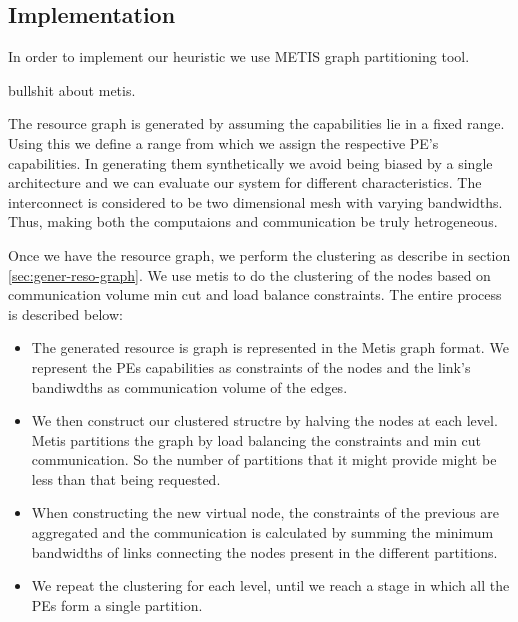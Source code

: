 \subsection{Implementation}
\label{sec:imple}

In order to implement our heuristic we use METIS \cite{} graph
partitioning tool.

bullshit about metis.

The resource graph is generated by assuming the capabilities lie in a
fixed range. Using this we define a range from which we assign the
respective PE's capabilities. In generating them synthetically we avoid
being biased by a single architecture and we can evaluate our system
for different characteristics. The interconnect is considered to be two
dimensional mesh with varying bandwidths. Thus, making both the
computaions and communication be truly hetrogeneous.

Once we have the resource graph, we perform the clustering as describe
in section \ref{sec:gener-reso-graph}. We use metis to do the
clustering of the nodes based on communication volume min cut and load
balance constraints. The entire process is described below:

\begin{itemize}

\item The generated resource is graph is represented in the Metis
graph format. We represent the PEs capabilities as constraints of the
nodes and the link's bandiwdths as communication volume of the edges.

\item We then construct our clustered structre by halving the nodes at
each level. Metis partitions the graph by load balancing the
constraints and min cut communication. So the number of partitions
that it might provide might be less than that being requested.

\item When constructing the new virtual node, the constraints of the
previous are aggregated and the communication is calculated by summing
the minimum bandwidths of links connecting the nodes present in the
different partitions.

\item We repeat the clustering for each level, until we reach a stage
in which all the PEs form a single partition.

\end{itemize}
